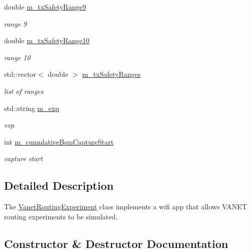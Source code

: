\begin{DoxyCompactItemize}
double \hyperlink{classVanetRoutingExperiment_ad2675092fe212a15aa1f0b60fb2bea8d}{m\+\_\+tx\+Safety\+Range9}
\begin{DoxyCompactList}\small\item\em range 9 \end{DoxyCompactList}\item 
double \hyperlink{classVanetRoutingExperiment_a70efcbeee57dd1b12364ff3ef00f7b02}{m\+\_\+tx\+Safety\+Range10}
\begin{DoxyCompactList}\small\item\em range 10 \end{DoxyCompactList}\item 
std\+::vector$<$ double $>$ \hyperlink{classVanetRoutingExperiment_a6cd05046b2e71e266ee72b0d31f8dcc9}{m\+\_\+tx\+Safety\+Ranges}
\begin{DoxyCompactList}\small\item\em list of ranges \end{DoxyCompactList}\item 
std\+::string \hyperlink{classVanetRoutingExperiment_aead1047ca417585765814ed61fb15fb3}{m\+\_\+exp}
\begin{DoxyCompactList}\small\item\em exp \end{DoxyCompactList}\item 
int \hyperlink{classVanetRoutingExperiment_a6bb964b8c0224a5651c6fbd8c93109e8}{m\+\_\+cumulative\+Bsm\+Capture\+Start}
\begin{DoxyCompactList}\small\item\em capture start \end{DoxyCompactList}\end{DoxyCompactItemize}


\subsection{Detailed Description}
The \hyperlink{classVanetRoutingExperiment}{Vanet\+Routing\+Experiment} class implements a wifi app that allows V\+A\+N\+ET routing experiments to be simulated. 

\subsection{Constructor \& Destructor Documentation}
